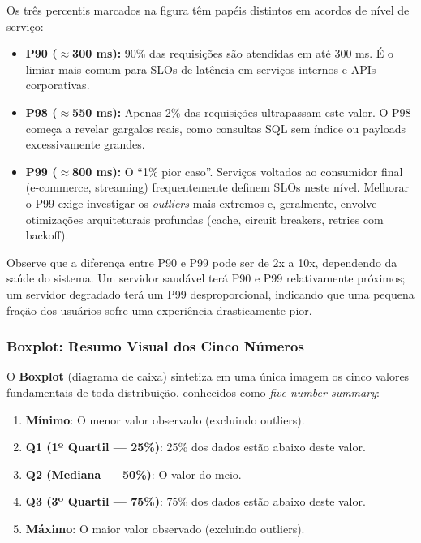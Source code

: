 \documentclass[12pt,a4paper]{report}
\begin{document}
Os três percentis marcados na figura têm papéis distintos em acordos de nível de serviço:

\begin{itemize}[nosep]
    \item \textbf{P90 ($\approx$300 ms):} 90\% das requisições são atendidas em até 300 ms. É o limiar mais comum para SLOs de latência em serviços internos e APIs corporativas.
    \item \textbf{P98 ($\approx$550 ms):} Apenas 2\% das requisições ultrapassam este valor. O P98 começa a revelar gargalos reais, como consultas SQL sem índice ou payloads excessivamente grandes.
    \item \textbf{P99 ($\approx$800 ms):} O ``1\% pior caso''. Serviços voltados ao consumidor final (e-commerce, streaming) frequentemente definem SLOs neste nível. Melhorar o P99 exige investigar os \textit{outliers} mais extremos e, geralmente, envolve otimizações arquiteturais profundas (cache, circuit breakers, retries com backoff).
\end{itemize}

Observe que a diferença entre P90 e P99 pode ser de 2x a 10x, dependendo da saúde do sistema. Um servidor saudável terá P90 e P99 relativamente próximos; um servidor degradado terá um P99 desproporcional, indicando que uma pequena fração dos usuários sofre uma experiência drasticamente pior.

\subsubsection{Boxplot: Resumo Visual dos Cinco Números}

O \textbf{Boxplot} (diagrama de caixa) sintetiza em uma única imagem os cinco valores fundamentais de toda distribuição, conhecidos como \textit{five-number summary}:

\begin{enumerate}[nosep]
    \item \textbf{Mínimo}: O menor valor observado (excluindo outliers).
    \item \textbf{Q1 (1º Quartil --- 25\%)}: 25\% dos dados estão abaixo deste valor.
    \item \textbf{Q2 (Mediana --- 50\%)}: O valor do meio.
    \item \textbf{Q3 (3º Quartil --- 75\%)}: 75\% dos dados estão abaixo deste valor.
    \item \textbf{Máximo}: O maior valor observado (excluindo outliers).
\end{enumerate}
\end{document}
